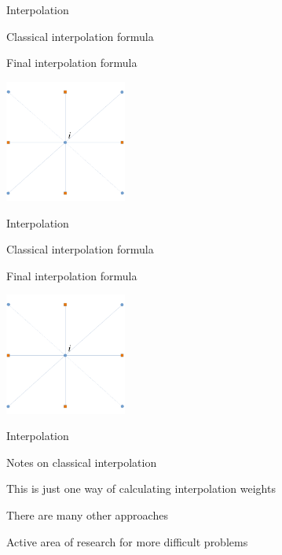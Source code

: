 \documentclass[18pt,xcolor=table]{beamer}
\begin{document}
\begin{frame}{Interpolation}
\begin{block}{Classical interpolation formula}
\bit
\item Final interpolation formula
\eit
\end{block}
\begin{center}
\includegraphics[width=0.3\textwidth]{../figures/interpStencilCpts}
\end{center}
\end{frame}

\begin{frame}{Interpolation}
\begin{block}{Classical interpolation formula}
\bit
\item Final interpolation formula
\eit
\end{block}
\begin{center}
\includegraphics[width=0.3\textwidth]{../figures/interpStencilCpts}
\end{center}
\end{frame}

\begin{frame}{Interpolation}
\begin{block}{Notes on classical interpolation}
\bit
\item This is just one way of calculating interpolation weights
\item There are many other approaches
\item Active area of research for more difficult problems
\eit
\end{block}
\end{frame}
\end{document}
